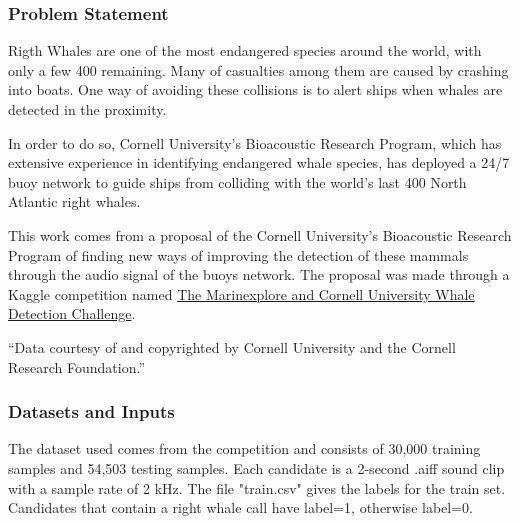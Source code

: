 \documentclass[]{article}
\newcommand{\competition}{The Marinexplore and Cornell University Whale Detection Challenge}
\begin{document}
\subsubsection{Problem Statement}\label{problem-statement}

Rigth Whales are one of the most endangered species around the world, with only a few 400 remaining. Many of casualties among them are caused by crashing into boats. One way of avoiding these collisions is to alert ships when whales are detected in the proximity.

In order to do so, Cornell University's Bioacoustic Research Program, which has extensive experience in identifying endangered whale species, has deployed a 24/7 buoy network to guide ships from colliding with the world's last 400 North Atlantic right whales.

This work comes from a proposal of the Cornell University's Bioacoustic Research Program of finding new ways of improving the detection of these mammals through the audio signal of the buoys network. The proposal was made through a Kaggle competition named \href{https://www.kaggle.com/c/whale-detection-challenge}{\competition}.

“Data courtesy of and copyrighted by Cornell University and the Cornell Research Foundation.”

\subsubsection{Datasets and Inputs}\label{datasets-and-inputs}

The dataset used comes from the competition and consists of 30,000 training samples and 54,503 testing samples. Each candidate is a 2-second .aiff sound clip with a sample rate of 2 kHz. The file "train.csv" gives the labels for the train set. Candidates that contain a right whale call have label=1, otherwise label=0.
\end{document}
